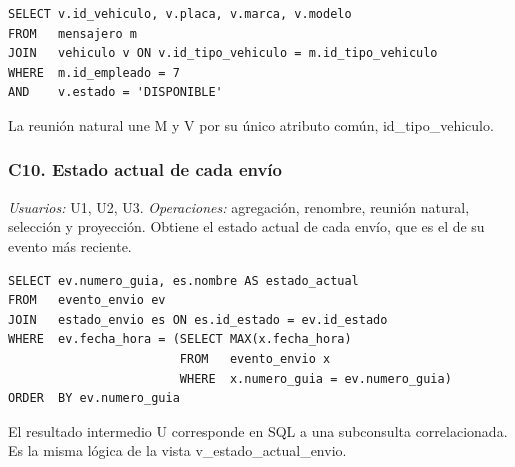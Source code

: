 \begin{center}\end{center}

\begin{lstlisting}[style=sqlpro]
SELECT v.id_vehiculo, v.placa, v.marca, v.modelo
FROM   mensajero m
JOIN   vehiculo v ON v.id_tipo_vehiculo = m.id_tipo_vehiculo
WHERE  m.id_empleado = 7
AND    v.estado = 'DISPONIBLE'
\end{lstlisting}
La reunión natural une M y V por su único atributo común, id\_tipo\_vehiculo.


\subsubsection{C10. Estado actual de cada envío}
\label{q:C10}
\textit{Usuarios:} U1, U2, U3. \textit{Operaciones:} agregación, renombre, reunión natural, selección y proyección. Obtiene el estado actual de cada envío, que es el de su evento más reciente.

\begin{center}\end{center}

\begin{lstlisting}[style=sqlpro]
SELECT ev.numero_guia, es.nombre AS estado_actual
FROM   evento_envio ev
JOIN   estado_envio es ON es.id_estado = ev.id_estado
WHERE  ev.fecha_hora = (SELECT MAX(x.fecha_hora)
                        FROM   evento_envio x
                        WHERE  x.numero_guia = ev.numero_guia)
ORDER  BY ev.numero_guia
\end{lstlisting}
El resultado intermedio U corresponde en SQL a una subconsulta correlacionada. Es la misma lógica de la vista v\_estado\_actual\_envio.


